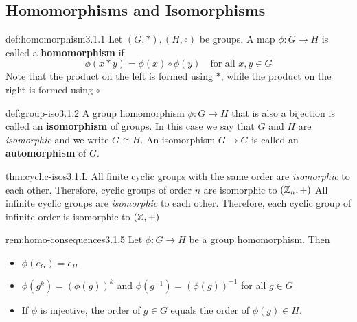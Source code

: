 \documentclass[landscape, 8pt]{extarticle}
\begin{document}
\begin{multicols}{3}
\subsection*{Homomorphisms and Isomorphisms}
\begin{dfn}{def:homomorphism}{3.1.1}
    Let $(G,*),(H,\circ)$ be groups. A map $\phi:G\to H$ is called a \textbf{homomorphism} if
    $$\phi(x*y)=\phi(x)\circ\phi(y)\quad \text{for all } x,y\in G$$
    Note that the product on the left is formed using $\ast$, while the product on the right is formed using $\circ$
\end{dfn}
\vspace{-5pt}

\begin{dfn}{def:group-iso}{3.1.2}
    A group homomorphism $\phi:G\to H$ that is also a bijection is called an \textbf{isomorphism} of groups. In this case we say that $G$ and $H$ are \textit{isomorphic} and we write $G\cong H$. 
    An isomorphism $G\to G$ is called an \textbf{automorphism} of $G$.
\end{dfn}
\vspace{-5pt}

\begin{thm}{thm:cyclic-isos}{3.1.L}
All finite cyclic groups with the same order are \textit{isomorphic} to each other. Therefore, cyclic groups of order $n$ are isomorphic to $(\mathbb{Z}_{n}, +)$
\vspace{0pt}\newline
All infinite cyclic groups are \textit{isomorphic} to each other. Therefore, each cyclic group of infinite order is isomorphic to $(\mathbb{Z}, +)$
\end{thm}
\vspace{-5pt}



\begin{rem}{rem:homo-consequences}{3.1.5}
Let $\phi:G\to H$ be a group homomorphism. Then
\renewcommand\labelitemi{\tiny$\bullet$}
\begin{itemize}
    \setlength\itemsep{0em}
    \item $\phi(e_{G})=e_{H}$
    \item $\phi(g^k)=(\phi(g))^{k}$ and $\phi(g^{-1})=(\phi(g))^{-1}$ for all $g\in G$
    \item If $\phi$ is injective, the order of $g\in G$ equals the order of $\phi(g)\in H$.
\end{itemize}
\end{rem}
\vspace{-5pt}


\end{multicols}
\end{document}
